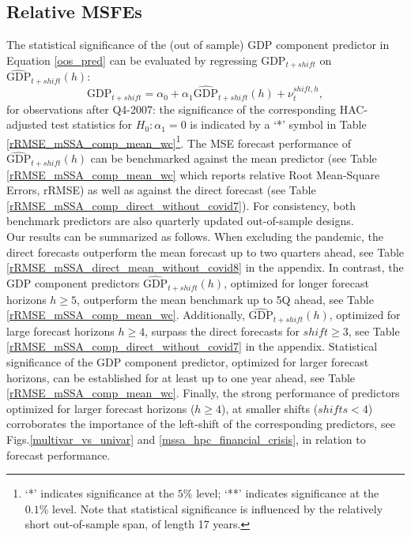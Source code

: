 \documentclass[11pt,a4paper]{article}
\begin{document}
\subsection{Relative MSFEs}\label{oosp}

The statistical significance of the (out of sample) GDP component predictor in Equation \ref{oos_pred}  can be evaluated by regressing 
$\textrm{GDP}_{t+shift}$ on $\hat{\textrm{GDP}}_{t+shift}(h)$:
\begin{equation}\label{eq_gdp_pred}
\textrm{GDP}_{t+shift}=\alpha_0+\alpha_1\hat{\textrm{GDP}}_{t+shift}(h)+\nu_{t}^{shift,h},
\end{equation}
for observations after Q4-2007: the significance of the corresponding HAC-adjusted test statistics for $H_0 : \alpha_1 =0$ is indicated by a `*' symbol in Table \ref{rRMSE_mSSA_comp_mean_wc}\footnote{`*' indicates significance at the $5\%$ level; `**' indicates significance at the $0.1\%$ level. Note that statistical significance is influenced by the relatively short out-of-sample span, of length 17 years.}. The MSE forecast performance of $\hat{\textrm{GDP}}_{t+shift}(h)$ can be benchmarked against the mean predictor (see Table \ref{rRMSE_mSSA_comp_mean_wc} which reports relative Root Mean-Square Errors, rRMSE) as well as against the direct forecast (see Table \ref{rRMSE_mSSA_comp_direct_without_covid7}). For consistency, both benchmark predictors are also quarterly updated out-of-sample designs.\\


Our results can be summarized as follows. When excluding the pandemic, the direct forecasts outperform the mean forecast up to two quarters ahead, see Table \ref{rRMSE_mSSA_direct_mean_without_covid8} in the appendix. %
In contrast, the GDP component predictors $\hat{\textrm{GDP}}_{t+shift}(h)$, optimized for longer forecast horizons $h\geq 5$, outperform the mean benchmark up to 5Q ahead, see Table \ref{rRMSE_mSSA_comp_mean_wc}. Additionally,  $\hat{\textrm{GDP}}_{t+shift}(h)$, optimized for large forecast horizons $h\geq 4$, surpass the direct forecasts for $shift\geq 3$, see Table \ref{rRMSE_mSSA_comp_direct_without_covid7} in the appendix. Statistical significance of the GDP component predictor, optimized for larger forecast horizons, can be established for at least up to one year ahead, see Table \ref{rRMSE_mSSA_comp_mean_wc}. Finally, the strong performance of predictors optimized for larger forecast horizons ($h\geq 4$), at smaller shifts ($shifts< 4$) corroborates the importance of the left-shift of the corresponding predictors, see Figs.\ref{multivar_vs_univar} and \ref{mssa_hpc_financial_crisis}, in relation to forecast performance.  
\end{document}
